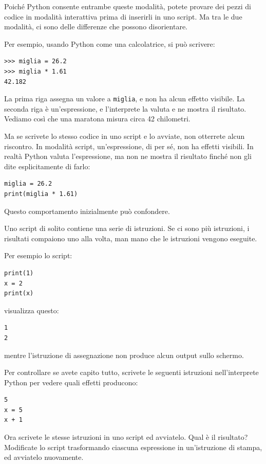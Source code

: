 \documentclass[10pt]{book}
\begin{document}
Poiché Python consente entrambe queste modalità, potete provare dei pezzi di codice in modalità interattiva prima di inserirli in uno script. Ma tra le due modalità, ci sono delle differenze che possono disorientare.

Per esempio, usando Python come una calcolatrice, si può scrivere:

\begin{verbatim}
>>> miglia = 26.2
>>> miglia * 1.61
42.182
\end{verbatim}

La prima riga assegna un valore a {\tt miglia}, e non ha alcun effetto visibile. La seconda riga è un'espressione, e l'interprete la valuta e ne mostra il risultato. Vediamo così che una maratona misura circa 42 chilometri.

Ma se scrivete lo stesso codice in uno script e lo avviate, non otterrete alcun riscontro. In modalità script, un'espressione, di per sé, non ha effetti visibili. In realtà Python valuta l'espressione, ma non ne mostra il risultato finché non gli dite esplicitamente di farlo:

\begin{verbatim}
miglia = 26.2
print(miglia * 1.61)
\end{verbatim}

Questo comportamento inizialmente può confondere.

Uno script di solito contiene una serie di istruzioni. Se ci sono più istruzioni, i risultati compaiono uno alla volta, man mano che le istruzioni vengono eseguite.

Per esempio lo script:

\begin{verbatim}
print(1)
x = 2
print(x)
\end{verbatim}
%
visualizza questo:

\begin{verbatim}
1
2
\end{verbatim}
%
mentre l'istruzione di assegnazione non produce alcun output sullo schermo.

Per controllare se avete capito tutto, scrivete le seguenti istruzioni nell'interprete Python per vedere quali effetti producono:

\begin{verbatim}
5
x = 5
x + 1
\end{verbatim}
%
Ora scrivete le stesse istruzioni in uno script ed avviatelo. Qual è il risultato? Modificate lo script trasformando ciascuna espressione in un'istruzione di stampa, ed avviatelo nuovamente.
\end{document}
